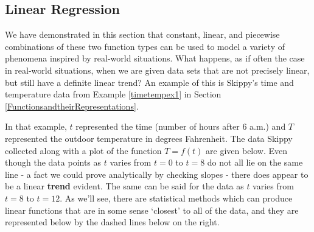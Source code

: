 \documentclass{ximera}
\begin{document}
\subsection{Linear Regression}
\label{LinearRegression}
 
We have demonstrated in this section that constant, linear, and piecewise combinations of these two function types can be used to model a variety of phenomena inspired by real-world situations.  What happens, as if often the case in real-world situations, when we are given data sets that are not precisely linear, but still have a definite linear trend?  An example of this is Skippy's  time and temperature data from Example \ref{timetempex1} in Section \ref{FunctionsandtheirRepresentations}. 



In that example, $t$ represented the time (number of hours after 6 a.m.) and $T$ represented the outdoor temperature in degrees Fahrenheit. The data Skippy collected along with a plot of the function $T = f(t)$ are given below. Even though the data points as $t$ varies from $t = 0$ to $t = 8$ do not all lie on the same line - a fact we could prove analytically by checking slopes - there does appear to be a linear \textbf{trend} evident.  The same can be said for the data as $t$ varies from $t =8 $ to $t = 12$.  As we'll see, there are statistical methods which can produce  linear functions that are in some sense `closest' to all of the data, and they are represented below by the dashed lines below on the right. 
\end{document}
